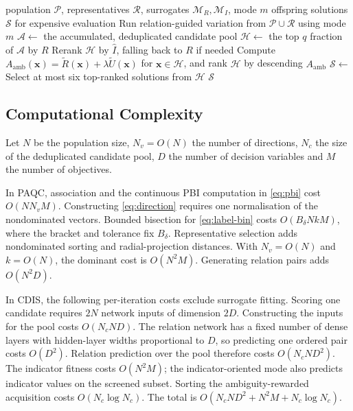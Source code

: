 \documentclass[final,5p,times,twocolumn]{elsarticle}
\newcommand{\vx}{\mathbf{x}}
\begin{document}
\begin{algorithm}[t]
\caption{DiversifiedInfillSelection (CDIS)}
\label{alg:cdis}
\begin{algorithmic}[1]
\Require population $\mathcal{P}$, representatives $\mathcal{R}$,
         surrogates $\mathcal{M}_R,\mathcal{M}_I$, mode $m$
\Ensure offspring solutions $\mathcal{S}$ for expensive evaluation
\State Run relation-guided variation from $\mathcal{P}\cup\mathcal{R}$ using mode $m$
\State $\mathcal{A}\gets$ the accumulated, deduplicated candidate pool
\State $\mathcal{H}\gets$ the top $q$ fraction of $\mathcal{A}$ by $R$
  \State Rerank $\mathcal{H}$ by $\widehat I$, falling back to $R$ if needed
\Else
  \State Compute $A_{\mathrm{amb}}(\vx)=\widetilde R(\vx)+\lambda\widetilde U(\vx)$
         for $\vx\in\mathcal{H}$,
  \Statex \hspace{\algorithmicindent}and rank $\mathcal{H}$ by descending $A_{\mathrm{amb}}$
\EndIf
\State $\mathcal{S}\gets$ Select at most six top-ranked solutions from $\mathcal{H}$
\State \Return $\mathcal{S}$
\end{algorithmic}
\end{algorithm}

\subsection{Computational Complexity}
\label{sec:method:complexity}

Let $N$ be the population size, $N_v=O(N)$ the number of directions, $N_c$ the
size of the deduplicated candidate pool, $D$ the number of decision variables
and $M$ the number of objectives.

In PAQC, association and the continuous PBI computation in \eqref{eq:pbi}
cost $O(NN_vM)$. Constructing \eqref{eq:direction} requires one normalisation
of the nondominated vectors. Bounded bisection for \eqref{eq:label-bin} costs
$O(B_\delta NkM)$, where the bracket and tolerance fix $B_\delta$.
Representative selection adds nondominated sorting and radial-projection
distances. With $N_v=O(N)$ and $k=O(N)$, the dominant cost is $O(N^2M)$.
Generating relation pairs adds $O(N^2D)$.

In CDIS, the following per-iteration costs exclude surrogate fitting.
Scoring one candidate requires $2N$ network inputs of
dimension $2D$. Constructing the inputs for the pool costs $O(N_cND)$.
The relation network has a fixed number of dense layers with hidden-layer widths
proportional to $D$, so predicting one ordered pair costs $O(D^2)$.
Relation prediction over the pool therefore costs $O(N_cND^2)$.
The indicator fitness costs $O(N^2M)$; the indicator-oriented mode also
predicts indicator values on the screened subset. Sorting the ambiguity-rewarded acquisition
costs $O(N_c\log N_c)$.
The total is $O(N_cND^2+N^2M+N_c\log N_c)$.
\end{document}
